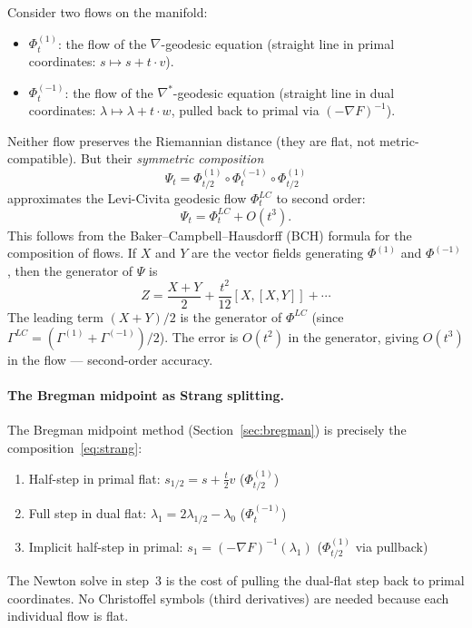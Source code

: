 \documentclass[11pt]{article}
\begin{document}
Consider two flows on the manifold:
\begin{itemize}
  \item $\Phi^{(1)}_t$: the flow of the $\nabla$-geodesic equation (straight
    line in primal coordinates: $s \mapsto s + t \cdot v$).
  \item $\Phi^{(-1)}_t$: the flow of the $\nabla^*$-geodesic equation
    (straight line in dual coordinates: $\lambda \mapsto \lambda + t \cdot w$,
    pulled back to primal via $(-\nabla F)^{-1}$).
\end{itemize}
Neither flow preserves the Riemannian distance (they are flat, not
metric-compatible).  But their \emph{symmetric composition}
\begin{equation}\label{eq:strang}
  \Psi_t = \Phi^{(1)}_{t/2} \circ \Phi^{(-1)}_t \circ \Phi^{(1)}_{t/2}
\end{equation}
approximates the Levi-Civita geodesic flow $\Phi^{LC}_t$ to second order:
\begin{equation}\label{eq:bch}
  \Psi_t = \Phi^{LC}_t + O(t^3).
\end{equation}
This follows from the Baker--Campbell--Hausdorff (BCH) formula for the
composition of flows.  If $X$ and $Y$ are the vector fields generating
$\Phi^{(1)}$ and $\Phi^{(-1)}$, then the generator of $\Psi$ is
\[
  Z = \frac{X + Y}{2} + \frac{t^2}{12}[X, [X, Y]] + \cdots
\]
The leading term $(X+Y)/2$ is the generator of $\Phi^{LC}$ (since
$\Gamma^{LC} = (\Gamma^{(1)} + \Gamma^{(-1)})/2$).  The error is
$O(t^2)$ in the generator, giving $O(t^3)$ in the flow --- second-order
accuracy.

\paragraph{The Bregman midpoint as Strang splitting.}
The Bregman midpoint method (Section~\ref{sec:bregman}) is precisely
the composition~\eqref{eq:strang}:
\begin{enumerate}
  \item Half-step in primal flat: $s_{1/2} = s + \frac{t}{2} v$
    \hfill ($\Phi^{(1)}_{t/2}$)
  \item Full step in dual flat: $\lambda_1 = 2\lambda_{1/2} - \lambda_0$
    \hfill ($\Phi^{(-1)}_t$)
  \item Implicit half-step in primal: $s_1 = (-\nabla F)^{-1}(\lambda_1)$
    \hfill ($\Phi^{(1)}_{t/2}$ via pullback)
\end{enumerate}
The Newton solve in step~3 is the cost of pulling the dual-flat step back
to primal coordinates.  No Christoffel symbols (third derivatives) are
needed because each individual flow is flat.
\end{document}
